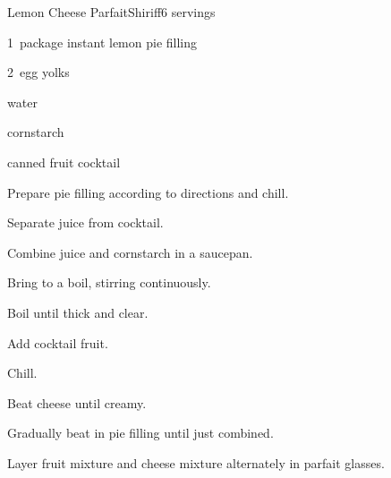 \begin{recipe}{Lemon Cheese Parfait}{Shiriff}{6 servings}

\begin{ingredients}
\item 1~package instant lemon pie filling
\item 2~egg yolks
\item \C{2\half} water
\item {} cornstarch
\item {} canned fruit cocktail
\item {} 
\end{ingredients}

\begin{directions}
\item Prepare pie filling according to directions and chill.
\item Separate juice from cocktail.
\item Combine juice and cornstarch in a saucepan.
\item Bring to a boil, stirring continuously.
\item Boil until thick and clear.
\item Add cocktail fruit.
\item Chill.
\item Beat cheese until creamy.
\item Gradually beat in pie filling until just combined.
\item Layer fruit mixture and cheese mixture alternately in parfait glasses.
\end{directions}

\end{recipe}
